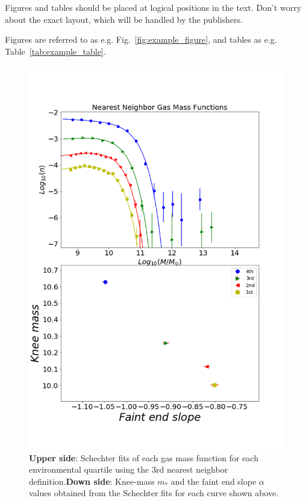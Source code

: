 \documentclass[a4paper,fleqn,usenatbib]{mnras}
\begin{document}
Figures and tables should be placed at logical positions in the text. Don't
worry about the exact layout, which will be handled by the publishers.

Figures are referred to as e.g. Fig.~\ref{fig:example_figure}, and tables as
e.g. Table~\ref{tab:example_table}.

\begin{figure}
	\includegraphics[width=\columnwidth]{./pics/quartilesGas.png}
    \caption{\textbf{Upper side}: Schechter fits of each gas mass function for each environmental quartile using the 3rd nearest neighbor definition.\textbf{Down side}: Knee-mass $m_\ast$ and the faint end slope $\alpha$ values obtained from the Schechter fits for each curve shown above.}
    \label{fig:quartilesGas}
\end{figure}
\end{document}
